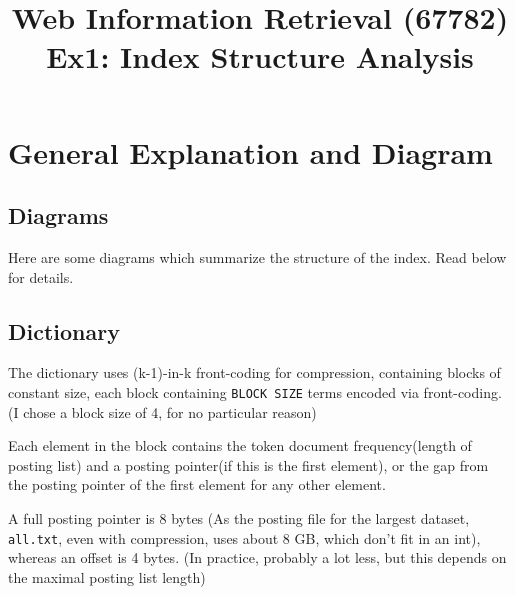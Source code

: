 \documentclass[11pt]{article}
\begin{document}
\title{Web Information Retrieval (67782)\\ Ex1: Index Structure Analysis}
\date{}

\maketitle
{}


\section{General Explanation and Diagram}

\begin{comment}
{\em This section should contain the  precise details behind the index structure that you have implemented. Your discussion should be very specific and should allow the reader to precisely understand the format of your index files, stored on disk. Provide a diagram that depicts the structure of the index. }
\end{comment}


\subsection{Diagrams}

Here are some diagrams which summarize the structure of the index. Read below for details.





\subsection{Dictionary}

The dictionary uses (k-1)-in-k front-coding for compression, containing blocks of constant size, each block containing \verb+BLOCK SIZE+ terms
encoded via front-coding. (I chose a block size of 4, for no particular reason)

Each element in the block contains the token document frequency(length of posting list) and a posting pointer(if this is the first element), or the gap from the posting pointer of the first element for any other element.

A full posting pointer is 8 bytes (As the posting file for the largest dataset, \texttt{all.txt}, even with compression, uses about 8 GB, which
don't fit in an int), whereas an offset is 4 bytes. (In practice, probably a lot less, but this depends on the maximal posting list length)
\end{document}
